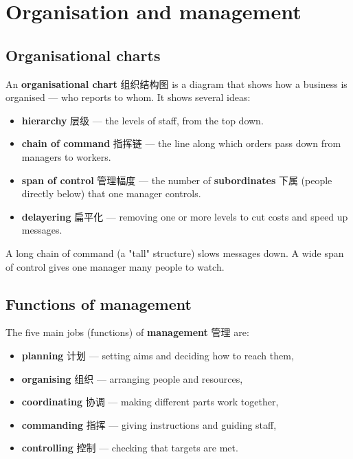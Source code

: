 \documentclass[11pt]{article}
\begin{document}
\section*{Organisation and management}

\subsection*{Organisational charts}

An \textbf{organisational chart} 组织结构图 is a diagram that shows how a business is organised — who reports to whom. It shows several ideas:

\begin{itemize}
\item \textbf{hierarchy} 层级 — the levels of staff, from the top down.

\item \textbf{chain of command} 指挥链 — the line along which orders pass down from managers to workers.

\item \textbf{span of control} 管理幅度 — the number of \textbf{subordinates} 下属 (people directly below) that one manager controls.

\item \textbf{delayering} 扁平化 — removing one or more levels to cut costs and speed up messages.

\end{itemize}

A long chain of command (a "tall" structure) slows messages down. A wide span of control gives one manager many people to watch.

\subsection*{Functions of management}

The five main jobs (functions) of \textbf{management} 管理 are:

\begin{itemize}
\item \textbf{planning} 计划 — setting aims and deciding how to reach them,

\item \textbf{organising} 组织 — arranging people and resources,

\item \textbf{coordinating} 协调 — making different parts work together,

\item \textbf{commanding} 指挥 — giving instructions and guiding staff,

\item \textbf{controlling} 控制 — checking that targets are met.

\end{itemize}
\end{document}
